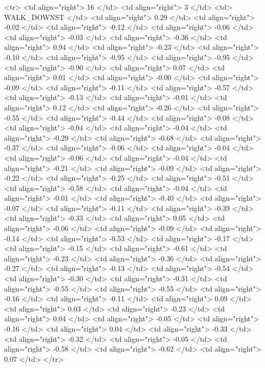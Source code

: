   <tr> <td align="right"> 16 </td> <td align="right">   3 </td> <td> WALK_DOWNST </td> <td align="right"> 0.29 </td> <td align="right"> -0.02 </td> <td align="right"> -0.12 </td> <td align="right"> -0.06 </td> <td align="right"> -0.03 </td> <td align="right"> -0.36 </td> <td align="right"> 0.94 </td> <td align="right"> -0.23 </td> <td align="right"> -0.10 </td> <td align="right"> -0.95 </td> <td align="right"> -0.95 </td> <td align="right"> -0.90 </td> <td align="right"> 0.07 </td> <td align="right"> 0.01 </td> <td align="right"> -0.00 </td> <td align="right"> -0.09 </td> <td align="right"> -0.11 </td> <td align="right"> -0.57 </td> <td align="right"> -0.13 </td> <td align="right"> -0.01 </td> <td align="right"> 0.12 </td> <td align="right"> -0.26 </td> <td align="right"> -0.55 </td> <td align="right"> -0.44 </td> <td align="right"> -0.08 </td> <td align="right"> -0.04 </td> <td align="right"> -0.04 </td> <td align="right"> -0.29 </td> <td align="right"> -0.68 </td> <td align="right"> -0.37 </td> <td align="right"> -0.06 </td> <td align="right"> -0.04 </td> <td align="right"> -0.06 </td> <td align="right"> -0.04 </td> <td align="right"> -0.21 </td> <td align="right"> -0.09 </td> <td align="right"> -0.22 </td> <td align="right"> -0.25 </td> <td align="right"> -0.51 </td> <td align="right"> -0.58 </td> <td align="right"> -0.04 </td> <td align="right"> -0.01 </td> <td align="right"> -0.40 </td> <td align="right"> -0.07 </td> <td align="right"> -0.11 </td> <td align="right"> -0.39 </td> <td align="right"> -0.33 </td> <td align="right"> 0.05 </td> <td align="right"> -0.06 </td> <td align="right"> -0.09 </td> <td align="right"> -0.14 </td> <td align="right"> -0.53 </td> <td align="right"> -0.17 </td> <td align="right"> -0.15 </td> <td align="right"> -0.61 </td> <td align="right"> -0.23 </td> <td align="right"> -0.36 </td> <td align="right"> -0.27 </td> <td align="right"> -0.13 </td> <td align="right"> -0.54 </td> <td align="right"> -0.30 </td> <td align="right"> -0.31 </td> <td align="right"> -0.55 </td> <td align="right"> -0.55 </td> <td align="right"> -0.16 </td> <td align="right"> -0.11 </td> <td align="right"> 0.09 </td> <td align="right"> 0.03 </td> <td align="right"> -0.23 </td> <td align="right"> 0.04 </td> <td align="right"> -0.05 </td> <td align="right"> -0.16 </td> <td align="right"> 0.04 </td> <td align="right"> -0.33 </td> <td align="right"> -0.32 </td> <td align="right"> -0.05 </td> <td align="right"> -0.58 </td> <td align="right"> -0.62 </td> <td align="right"> 0.07 </td> </tr>
